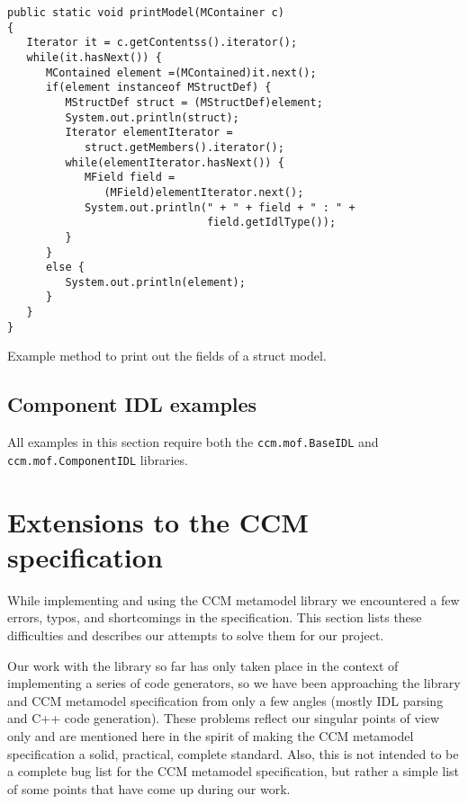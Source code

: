 \begin{Example}
\begin{minifbox}
\begin{verbatim}
public static void printModel(MContainer c)
{
   Iterator it = c.getContentss().iterator();
   while(it.hasNext()) {
      MContained element =(MContained)it.next();
      if(element instanceof MStructDef) {
         MStructDef struct = (MStructDef)element;
         System.out.println(struct);
         Iterator elementIterator =
            struct.getMembers().iterator();
         while(elementIterator.hasNext()) {
            MField field =
               (MField)elementIterator.next();
            System.out.println(" + " + field + " : " +
                               field.getIdlType());
         }
      }
      else {
         System.out.println(element);
      }
   }
}
\end{verbatim}
\end{minifbox}
\caption{Example method to print out the fields of a struct model.}
\label{example:metamodel-baseidl-struct-print}
\end{Example}

\subsection{Component IDL examples}

All examples in this section require both the {\tt ccm.mof.BaseIDL} and {\tt
ccm.mof.ComponentIDL} libraries.

\section{Extensions to the CCM specification}

While implementing and using the CCM metamodel library we encountered a few
errors, typos, and shortcomings in the specification. This section lists these
difficulties and describes our attempts to solve them for our project.

Our work with the library so far has only taken place in the context of
implementing a series of code generators, so we have been approaching the
library and CCM metamodel specification from only a few angles (mostly IDL
parsing and C++ code generation). These problems reflect our singular points of
view only and are mentioned here in the spirit of making the CCM metamodel
specification a solid, practical, complete standard. Also, this is not intended
to be a complete bug list for the CCM metamodel specification, but rather a
simple list of some points that have come up during our work.

